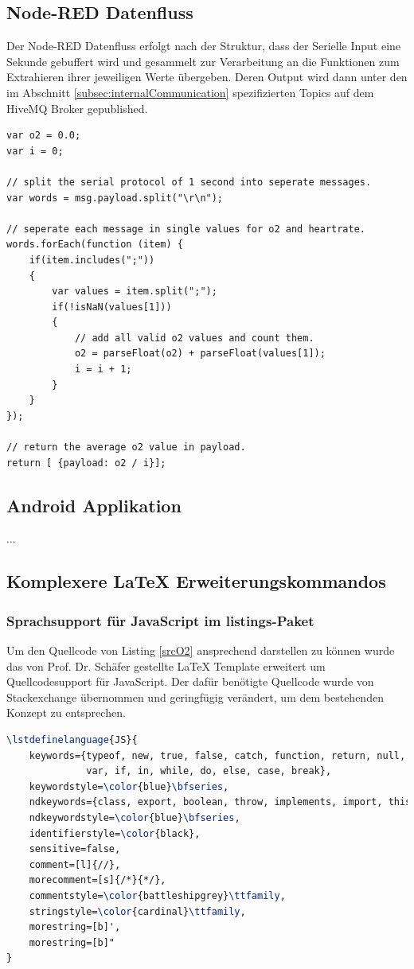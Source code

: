 \documentclass[12pt,oneside]{article}
\begin{document}
  \subsection{Node-RED Datenfluss}
	Der Node-RED\cite{nodeRED} Datenfluss erfolgt nach der Struktur, dass der Serielle Input eine Sekunde gebuffert wird und gesammelt zur Verarbeitung an die Funktionen zum Extrahieren ihrer jeweiligen Werte übergeben. Deren Output wird dann unter den im Abschnitt \ref{subsec:internalCommunication} spezifizierten Topics auf dem HiveMQ Broker gepublished.
	\begin{lstlisting}[language=JS, caption={Quellcode der Methode zum Lesen des Sauerstoffgehalts aus dem Buffer}, captionpos=b, label=srcO2]
var o2 = 0.0;
var i = 0;

// split the serial protocol of 1 second into seperate messages.
var words = msg.payload.split("\r\n");

// seperate each message in single values for o2 and heartrate.
words.forEach(function (item) {
	if(item.includes(";"))
	{
		var values = item.split(";");
		if(!isNaN(values[1]))
		{
			// add all valid o2 values and count them.
			o2 = parseFloat(o2) + parseFloat(values[1]);
			i = i + 1;
		}
	}
});

// return the average o2 value in payload.
return [ {payload: o2 / i}];
	\end{lstlisting}
	
  \subsection{Android Applikation}
  ...
  \subsection{Komplexere \LaTeX{} Erweiterungskommandos}
	\subsubsection{Sprachsupport für JavaScript im listings-Paket}
	  Um den Quellcode von Listing \ref{srcO2} ansprechend darstellen zu können wurde das von Prof. Dr. Schäfer gestellte \LaTeX{} Template erweitert um Quellcodesupport für JavaScript\cite{texJsInclusion}. Der dafür benötigte Quellcode wurde von Stackexchange übernommen und geringfügig verändert, um dem bestehenden Konzept zu entsprechen.
	  \begin{lstlisting}[language=tex, caption={\LaTeX{} Quellcode für JavaScript Support im Paket listings}, captionpos=b, label=srcJS]
\lstdefinelanguage{JS}{
	keywords={typeof, new, true, false, catch, function, return, null, catch, switch,
		      var, if, in, while, do, else, case, break},
	keywordstyle=\color{blue}\bfseries,
	ndkeywords={class, export, boolean, throw, implements, import, this},
	ndkeywordstyle=\color{blue}\bfseries,
	identifierstyle=\color{black},
	sensitive=false,
	comment=[l]{//},
	morecomment=[s]{/*}{*/},
	commentstyle=\color{battleshipgrey}\ttfamily,
	stringstyle=\color{cardinal}\ttfamily,
	morestring=[b]',
	morestring=[b]"
}
  	  \end{lstlisting}
	  
\end{document}

